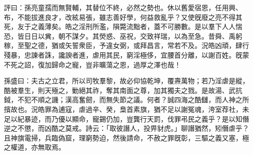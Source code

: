 \begin{pinyinscope}
評曰：孫亮童孺而無賢輔，其替位不終，必然之勢也。休以舊愛宿恩，任用興、布，不能拔進良才，改絃易張，雖志善好學，何益救亂乎？又使旣廢之亮不得其死，友于之義薄矣。皓之淫刑所濫，隕斃流黜者，蓋不可勝數。是以羣下人人惴恐，皆日日以兾，朝不謀夕。其熒惑、巫祝，交致祥瑞，以為至急。昔舜、禹躬稼，至聖之德，猶或矢誓衆臣，予違女弼，或拜昌言，常若不及。況皓凶頑，肆行殘暴，忠諫者誅，讒諛者進，虐用其民，窮淫極侈，宜腰首分離，以謝百姓。旣蒙不死之詔，復加歸命之寵，豈非曠蕩之恩，過厚之澤也哉！

孫盛曰：夫古之立君，所以司牧羣黎，故必仰協乾坤，覆燾萬物；若乃淫虐是縱，酷被羣生，則天殛之，勦絕其祚，奪其南面之尊，加其獨夫之戮。是故湯、武抗鉞，不犯不順之譏；漢高奮劒，而無失節之議。何者？誠四海之酷讎，而人神之所擯故也。況皓罪為逋寇，虐過辛、癸，梟首素旗，猶不足以謝冤魂，洿室荐社，未足以紀暴迹，而乃優以顯命，寵錫仍加，豈龔行天罰，伐罪弔民之義乎？是以知僭逆之不懲，而凶酷之莫戒。詩云：「取彼譖人，投畀豺虎。」聊譖猶然，矧僭虐乎？且神旗電掃，兵臨偽窟，理窮勢迫，然後請命，不赦之罪旣彰，三驅之義又塞，極之權道，亦無取焉。


\end{pinyinscope}
